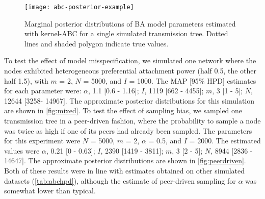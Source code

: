 \begin{figure}[ht]
    \centering
    \texttt{[image: abc-posterior-example]}
  \vspace{6pt}
  \caption{
    Marginal posterior distributions of BA model parameters estimated
    with kernel-ABC for a single simulated transmission tree. Dotted
    lines and shaded polygon indicate true values.
  }
  \label{fig:abcex}
\end{figure}



To test the effect of model misspecification, we simulated one network where
the nodes exhibited heterogeneous preferential attachment power (half 0.5, the
other half 1.5), with $m$ = 2, $N$ = 5000, and $I$ = 1000. The MAP [95\%
HPD] estimates for each parameter were: 
$\alpha$, 
  1.1 
  [0.6 -
   1.16];
$I$,
  1119 
  [662 -
   4455];
$m$,
  3 
  [1 -
   5];
$N$,
  12644 
  [3258-
   14967].
The approximate posterior distributions for this simulation are shown in
\cref{fig:mixed}. To test the effect of sampling bias, we sampled one
transmission tree in a peer-driven fashion, where the probability to sample a
node was twice as high if one of its peers had already been sampled. The
parameters for this experiment were $N$ = 5000, $m$ = 2, $\alpha$ = 0.5, and
$I$ = 2000. The estimated values were
$\alpha$, 
  0.21 
  [0 -
   0.63];
$I$,
  2390 
  [1419 -
   3811];
$m$,
  3 
  [2 -
   5];
$N$,
  8944 
  [2836 -
   14647].
The approximate posterior distributions are shown in \cref{fig:peerdriven}. Both
of these results were in line with estimates obtained on other simulated
datasets (\cref{tab:abchpd}), although the estimate of peer-driven sampling for
$\alpha$ was somewhat lower than typical.

